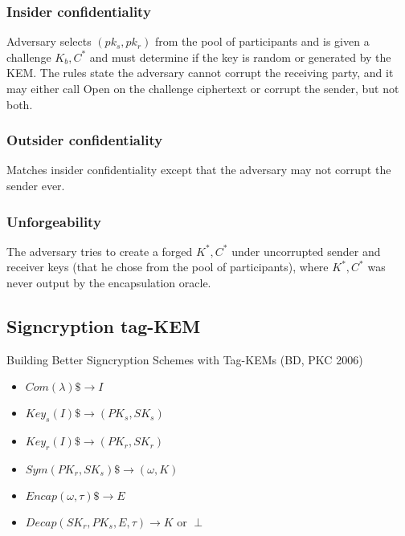\documentclass[11pt, pdftex]{article}
\begin{document}
\subsubsection{Insider confidentiality}

Adversary selects $(pk_s,pk_r)$ from the pool of participants and is given a challenge 
$K_b, C^*$ and must determine if the key is random or generated by the KEM.  
The rules state the adversary cannot corrupt the receiving party, and it may either call 
Open on the challenge ciphertext or corrupt the sender, but not both. 

\subsubsection{Outsider confidentiality}

Matches insider confidentiality except that the adversary may not corrupt the sender ever.

\subsubsection{Unforgeability}

The adversary tries to create a forged $K^*, C^*$ under uncorrupted sender and receiver keys 
(that he chose from the pool of participants), where $K^*, C^*$ was never output by the encapsulation oracle.

\subsection{Signcryption tag-KEM} 
Building Better Signcryption Schemes with Tag-KEMs (BD, PKC 2006)
\begin{itemize}
\item $Com(\lambda) \$\rightarrow I$
\item $Key_s(I) \$\rightarrow (PK_s, SK_s)$
\item $Key_r(I) \$\rightarrow (PK_r, SK_r)$
\item $Sym(PK_r, SK_s) \$\rightarrow (\omega, K)$
\item $Encap(\omega, \tau) \$\rightarrow E$
\item $Decap(SK_r, PK_s, E, \tau) \rightarrow K \text{ or }\perp$
\end{itemize}
\end{document}
